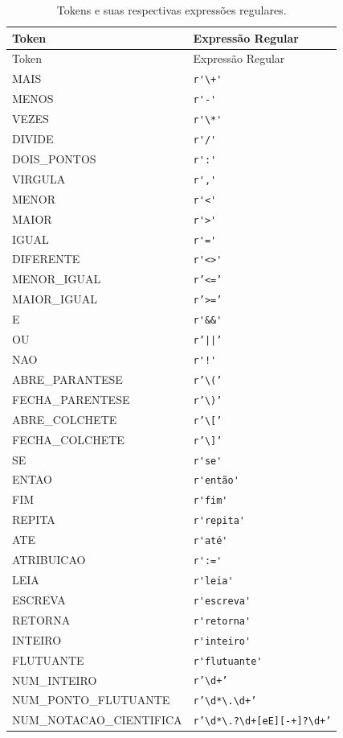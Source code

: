 \documentclass[
	12pt,				%
	oneside,   	        %
	a4paper,			%
	english,			%
	french,				%
	spanish,			%
	brazilian,				%
	]{pacotes/abntex2}
\begin{document}
\begin{longtable}{|>{\centering\arraybackslash}p{6cm}|>{\centering\arraybackslash}p{6cm}|}
\caption{Tokens e suas respectivas expressões regulares.}
\label{tab:tokens_regex} \\
\hline
\rowcolor{gray!20}
Token & Expressão Regular \\
\hline
\endfirsthead

\hline
\rowcolor{gray!20}
Token & Expressão Regular \\
\hline
\endhead

MAIS & \verb|r'\+'| \\
\hline
MENOS & \verb|r'-'| \\
\hline
VEZES & \verb|r'\*'| \\
\hline
DIVIDE & \verb|r'/'| \\
\hline
DOIS\_PONTOS & \verb|r':'| \\
\hline
VIRGULA & \verb|r','| \\
\hline
MENOR & \verb|r'<'| \\
\hline
MAIOR & \verb|r'>'| \\
\hline
IGUAL & \verb|r'='| \\
\hline
DIFERENTE & \verb|r'<>'| \\
\hline
MENOR\_IGUAL & \texttt{r'<='} \\
\hline
MAIOR\_IGUAL & \texttt{r'>='} \\
\hline
E & \verb|r'&&'| \\
\hline
OU & \texttt{r'||'} \\
\hline
NAO & \verb|r'!'| \\
\hline
ABRE\_PARANTESE & \texttt{r'\textbackslash('} \\
\hline
FECHA\_PARENTESE & \texttt{r'\textbackslash)'} \\
\hline
ABRE\_COLCHETE & \texttt{r'\textbackslash['} \\
\hline
FECHA\_COLCHETE & \texttt{r'\textbackslash]'} \\
\hline
SE & \verb|r'se'| \\
\hline
ENTAO & \verb|r'então'| \\
\hline
FIM & \verb|r'fim'| \\
\hline
REPITA & \verb|r'repita'| \\
\hline
ATE & \verb|r'até'| \\
\hline
ATRIBUICAO & \verb|r':='| \\
\hline
LEIA & \verb|r'leia'| \\
\hline
ESCREVA & \verb|r'escreva'| \\
\hline
RETORNA & \verb|r'retorna'| \\
\hline
INTEIRO & \verb|r'inteiro'| \\
\hline
FLUTUANTE & \verb|r'flutuante'| \\
\hline
NUM\_INTEIRO & \texttt{r'\textbackslash d+'} \\
\hline
NUM\_PONTO\_FLUTUANTE & \texttt{r'\textbackslash d*\textbackslash.\textbackslash d+'} \\
\hline
NUM\_NOTACAO\_CIENTIFICA & \texttt{r'\textbackslash d*\textbackslash.?\textbackslash d+[eE][-+]?\textbackslash d+'} \\
\hline

\end{longtable}
\end{document}
